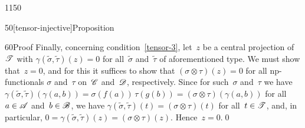 \begin{parsec}{1150}
\begin{point}{50}[tensor-injective]{Proposition}
\begin{point}{60}{Proof}
Finally,
concerning
condition~\ref{tensor-3},
let~$z$ be a central projection of~$\mathscr{T}$
with $\gamma(\tilde\sigma,\tilde\tau)(z)=0$
for all~$\tilde\sigma$
and~$\tilde\tau$ of aforementioned type.
We must show that~$z=0$,
and for this
it suffices to show that
$(\sigma\otimes \tau)(z)=0$
for all  np-functionals
$\sigma$ and~$\tau$ on~$\mathscr{C}$ and~$\mathscr{D}$,
respectively.
Since for such~$\sigma$ and~$\tau$
we have
$\gamma(\tilde\sigma,\tilde\tau)
(\gamma(a,b))
 = 
 \sigma(f(a))\,\tau(g(b))
 = (\sigma\otimes\tau)(\gamma(a,b))$
 for all~$a\in\mathscr{A}$ and~$b\in\mathscr{B}$,
 we have $\gamma(\tilde\sigma,\tilde\tau)
 (t) = (\sigma\otimes \tau)(t)$
 for all~$t\in\mathscr{T}$,
 and, in particular,
 $0=\gamma(\tilde\sigma,\tilde\tau)(z)
 = (\sigma\otimes\tau)(z)$.
 Hence~$z=0$.\qed
\end{point}
\end{point}
\end{parsec}%
